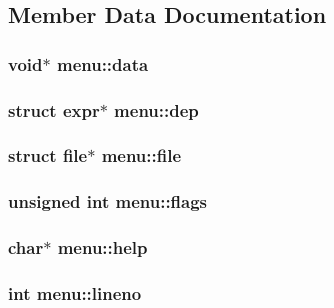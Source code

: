 \subsection{Member Data Documentation}
\hypertarget{structmenu_a0f989fd744677f0e506c9b991c08c128}{
\subsubsection[{data}]{\setlength{\rightskip}{0pt plus 5cm}void$\ast$ menu\-::data}}\label{structmenu_a0f989fd744677f0e506c9b991c08c128}
\hypertarget{structmenu_af75a37a9b8796c2c3c1204ee7489da41}{
\subsubsection[{dep}]{\setlength{\rightskip}{0pt plus 5cm}struct {\bf expr}$\ast$ menu\-::dep}}\label{structmenu_af75a37a9b8796c2c3c1204ee7489da41}
\hypertarget{structmenu_a7db14073a07042ac38e3504ee12f7840}{
\subsubsection[{file}]{\setlength{\rightskip}{0pt plus 5cm}struct {\bf file}$\ast$ menu\-::file}}\label{structmenu_a7db14073a07042ac38e3504ee12f7840}
\hypertarget{structmenu_ab910ce28a259aea500079aff5a01e474}{
\subsubsection[{flags}]{\setlength{\rightskip}{0pt plus 5cm}unsigned int menu\-::flags}}\label{structmenu_ab910ce28a259aea500079aff5a01e474}
\hypertarget{structmenu_a459acd63454c281fd66666ef7b8afe74}{
\subsubsection[{help}]{\setlength{\rightskip}{0pt plus 5cm}char$\ast$ menu\-::help}}\label{structmenu_a459acd63454c281fd66666ef7b8afe74}
\hypertarget{structmenu_a3c780bede2c6492249c477f0ae7a8463}{
\subsubsection[{lineno}]{\setlength{\rightskip}{0pt plus 5cm}int menu\-::lineno}}\label{structmenu_a3c780bede2c6492249c477f0ae7a8463}
